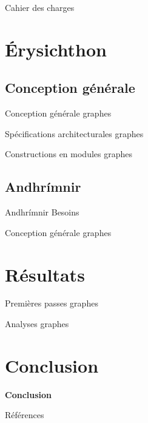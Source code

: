 \documentclass{backend/backend}
\begin{document}
\begin{frame}{Cahier des charges}
    
\end{frame}

\section{Érysichthon}
\subsection{Conception générale}
\begin{frame}{Conception générale}
    graphes
\end{frame}

\begin{frame}{Spécifications architecturales}
    graphes
\end{frame}

\begin{frame}{Constructions en modules}
    graphes
\end{frame}

\subsection{Andhrímnir}
\begin{frame}{Andhrímnir}
    Besoins
\end{frame}

\begin{frame}{Conception générale}
    graphes
\end{frame}

\section{Résultats}
\begin{frame}{Premières passes}
    graphes
\end{frame}

\begin{frame}{Analyses}
    graphes
\end{frame}

\section*{Conclusion}
\begin{frame}{}
    \begin{center}
        \Huge
        \textbf{Conclusion}
    \end{center}
\end{frame}

\begin{frame}{Références}
    \tiny
    \printbibliography
\end{frame}
\end{document}
